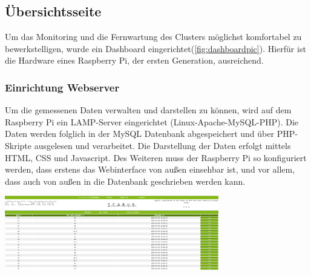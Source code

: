 \subsection{Übersichtsseite}
Um das Monitoring und die Fernwartung des Clusters möglichst komfortabel zu bewerkstelligen, wurde ein Dashboard eingerichtet(\ref{fig:dashboardpic}). Hierfür ist die Hardware eines Raspberry Pi, der ersten Generation, ausreichend.
\subsubsection{Einrichtung Webserver}
Um die gemessenen Daten verwalten und darstellen zu können, wird auf dem Raspberry Pi ein LAMP-Server eingerichtet (Linux-Apache-MySQL-PHP). Die Daten werden folglich in der MySQL Datenbank abgespeichert und über PHP-Skripte ausgelesen und verarbeitet. Die Darstellung der Daten erfolgt mittels HTML, CSS und Javascript. Des Weiteren muss der Raspberry Pi so konfiguriert werden, dass erstens das Webinterface von außen einsehbar ist, und vor allem, dass auch von außen in die Datenbank geschrieben werden kann.

\begin{minipage}{\textwidth}

\begin{center}
	\includegraphics[width=0.7\textwidth]{./Bilder/Dashboard/Dashboard_frontend.png}
	\label{fig:dashboardpic}

\end{center}	
\end{minipage}

